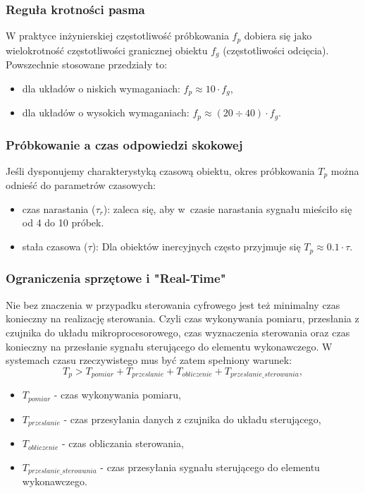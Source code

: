 \documentclass{article}
\begin{document}
        \subsubsection{Reguła krotności pasma}
        W praktyce inżynierskiej częstotliwość próbkowania
        $f_{p}$ dobiera się jako wielokrotność częstotliwości granicznej
        obiektu $f_g$ (częstotliwości odcięcia). Powszechnie stosowane
        przedziały to:
        \begin{itemize}
            \item dla układów o niskich wymaganiach: $f_p \approx 10 \cdot f_g$,
            \item dla układów o wysokich wymaganiach: $f_p \approx (20\div40) \cdot f_g$.
        \end{itemize}

        \subsubsection{Próbkowanie a czas odpowiedzi skokowej}
        Jeśli dysponujemy charakterystyką czasową obiektu, okres
        próbkowania $T_p$ można odnieść do parametrów czasowych:
        \begin{itemize}
            \item czas narastania ($\tau_r$): zaleca się, aby
            w~czasie narastania sygnału mieściło się od 4 do 10 próbek.
            \item stała czasowa ($\tau$): Dla obiektów inercyjnych często przyjmuje się $T_p \approx 0.1 \cdot \tau$.
        \end{itemize}

        \subsubsection{Ograniczenia sprzętowe i "Real-Time"}
        Nie bez znaczenia w przypadku sterowania cyfrowego jest
        też minimalny czas konieczny na realizację sterowania.
        Czyli czas wykonywania pomiaru, przesłania z czujnika do
        układu mikroprocesorowego, czas wyznaczenia sterowania oraz
        czas konieczny na przesłanie sygnału sterującego do elementu
        wykonawczego.
        W systemach czasu rzeczywistego mus być zatem spełniony warunek:
        $$
            T_p > T_{pomiar} + T_{przeslanie} + T_{obliczenie} + T_{przeslanie\_sterowania},
        $$
        \begin{itemize}
            \item $T_{pomiar}$ - czas wykonywania pomiaru,
            \item $T_{przeslanie}$ - czas przesyłania danych z czujnika do układu sterującego,
            \item $T_{obliczenie}$ - czas obliczania sterowania,
            \item $T_{przeslanie\_sterowania}$ - czas przesyłania sygnału sterującego do elementu wykonawczego.
        \end{itemize}
\end{document}

